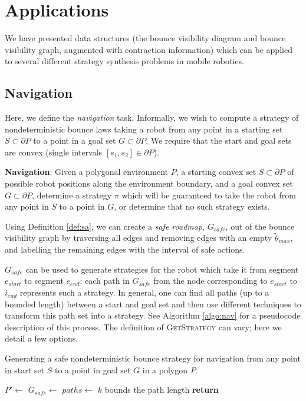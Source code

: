 \documentclass[]{styles/svproc}  %
\begin{document}
\section{Applications}

We have presented data structures (the bounce visibility diagram and bounce
visibility graph, augmented with contraction information) which can be applied
to several different strategy synthesis problems in mobile robotics.

\subsection{Navigation}

Here, we define the \emph{navigation} task. Informally, we wish to compute a strategy 
of nondeterministic bounce laws taking a robot
from any point in a starting set $S \subset \partial P$ to a point in a goal set
$G \subset \partial P$. We require that the start and goal sets are
convex (single intervals $[s_1, s_2] \in \partial P$).

\begin{definition}
\textbf{Navigation}:
Given a polygonal environment $P$, a starting convex set $S \subset \partial P$ of possible robot positions along the
environment boundary, and a goal convex set $G \subset \partial P$, determine a strategy $\pi$ which
will be guaranteed to take the robot from any point in $S$ to a point in $G$, or
determine that no such strategy exists.
\end{definition}

Using Definition \ref{def:sa}, we can create a \emph{safe roadmap}, $G_{safe}$,
out of the 
bounce visibility graph by traversing all edges and removing edges with an 
empty $\tilde{\theta}_{max}$, and labelling the remaining edges with the interval 
of safe actions.

$G_{safe}$ can be used to generate strategies for the
robot which take it from segment $e_{start}$ to segment $e_{end}$: each path in
$G_{safe}$ from the node corresponding to $e_{start}$ to $i_{end}$ represents
such a strategy. In general, one can find all paths (up to a bounded length)
between a start and goal set and then use different techniques to transform this
path set into a strategy. See Algorithm \ref{algo:nav} for a pseudocode
description of this process. The definition of \textsc{GetStrategy} can vary;
here we detail a few options.


\begin{algorithm}
\caption{Generating a safe nondeterministic bounce strategy for navigation from any
point in start set $S$ to a point in goal set $G$ in a polygon $P$.}
\label{algo:nav}

\begin{algorithmic}
\State $P' \gets$ 
\State $G_{safe} \gets$ 
\State $paths \gets$ 
\Comment $k$ bounds the path length
\State \textbf{return} 
\EndProcedure
\end{algorithmic}
\end{algorithm}
\end{document}
